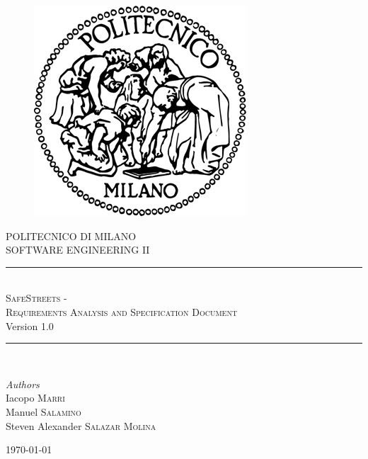 \documentclass[11pt,a4paper]{article}
\begin{document}
\begin{figure}[t]
    \includegraphics[scale=0.8]{logo_polimi.png}
    \centering
\end{figure}

\begin{titlepage}
    \newcommand{\HRule}{\rule{\linewidth}{0.5mm}}
    \center
    \textsc{\LARGE POLITECNICO DI MILANO}\\[1.5cm]
	
	\textsc{\Large SOFTWARE ENGINEERING II}\\[0.5cm]
	
	\HRule\\[0.4cm]
	    {\huge \textsc{SafeStreets - \\Requirements Analysis and Specification Document}}\\[0.4cm]
	    Version 1.0
    \HRule\\[1.5cm]
	
	\begin{minipage}{1\textwidth}
		\begin{flushleft}
			\large
			\textit{Authors}\\
			Iacopo \textsc{Marri}\\
			Manuel \textsc{Salamino}\\
			Steven Alexander \textsc{Salazar Molina}
		\end{flushleft}
	\end{minipage}
	
	\vfill\vfill\vfill %
	
	{\large\today}
	
\end{titlepage}


\newpage

\tableofcontents






%
\end{document}
